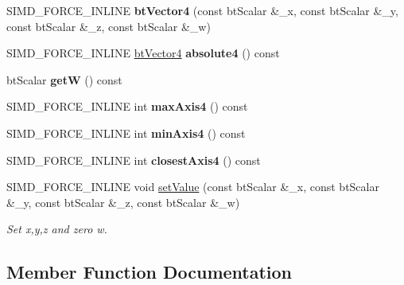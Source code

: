 \begin{DoxyCompactItemize}
S\+I\+M\+D\+\_\+\+F\+O\+R\+C\+E\+\_\+\+I\+N\+L\+I\+NE {\bfseries bt\+Vector4} (const bt\+Scalar \&\+\_\+x, const bt\+Scalar \&\+\_\+y, const bt\+Scalar \&\+\_\+z, const bt\+Scalar \&\+\_\+w)
\item 
\mbox{\label{classbtVector4_ad2e7c85de1bd51dc03f7e7e0fcb2bc4e}} 
S\+I\+M\+D\+\_\+\+F\+O\+R\+C\+E\+\_\+\+I\+N\+L\+I\+NE \hyperlink{classbtVector4}{bt\+Vector4} {\bfseries absolute4} () const
\item 
\mbox{\label{classbtVector4_aa5e27c8aa32b7f8ad8cdd96498fff837}} 
bt\+Scalar {\bfseries getW} () const
\item 
\mbox{\label{classbtVector4_af8547425d68728896fcc3b32fbf663d5}} 
S\+I\+M\+D\+\_\+\+F\+O\+R\+C\+E\+\_\+\+I\+N\+L\+I\+NE int {\bfseries max\+Axis4} () const
\item 
\mbox{\label{classbtVector4_a43e9d85b6230e3960946aac62021b80a}} 
S\+I\+M\+D\+\_\+\+F\+O\+R\+C\+E\+\_\+\+I\+N\+L\+I\+NE int {\bfseries min\+Axis4} () const
\item 
\mbox{\label{classbtVector4_a6aabaf2fc5ec47af13b2c0accb4cbdda}} 
S\+I\+M\+D\+\_\+\+F\+O\+R\+C\+E\+\_\+\+I\+N\+L\+I\+NE int {\bfseries closest\+Axis4} () const
\item 
S\+I\+M\+D\+\_\+\+F\+O\+R\+C\+E\+\_\+\+I\+N\+L\+I\+NE void \hyperlink{classbtVector4_a7653b136836ef8c5f66d20cb11a86ceb}{set\+Value} (const bt\+Scalar \&\+\_\+x, const bt\+Scalar \&\+\_\+y, const bt\+Scalar \&\+\_\+z, const bt\+Scalar \&\+\_\+w)
\begin{DoxyCompactList}\small\item\em Set x,y,z and zero w. \end{DoxyCompactList}\end{DoxyCompactItemize}


\subsection{Member Function Documentation}
\mbox{\label{classbtVector4_a7653b136836ef8c5f66d20cb11a86ceb}} 
